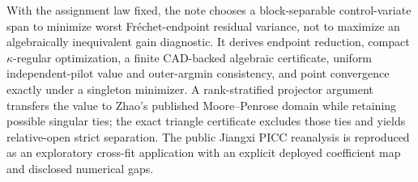 With the assignment law fixed, the note chooses a block-separable control-variate span to minimize worst Fr\'echet-endpoint residual variance, not to maximize an algebraically inequivalent gain diagnostic.  It derives endpoint reduction, compact \(\kappa\)-regular optimization, a finite CAD-backed algebraic certificate, uniform independent-pilot value and outer-argmin consistency, and point convergence exactly under a singleton minimizer.  A rank-stratified projector argument transfers the value to Zhao's published Moore--Penrose domain while retaining possible singular ties; the exact triangle certificate excludes those ties and yields relative-open strict separation.  The public Jiangxi PICC reanalysis is reproduced as an exploratory cross-fit application with an explicit deployed coefficient map and disclosed numerical gaps.